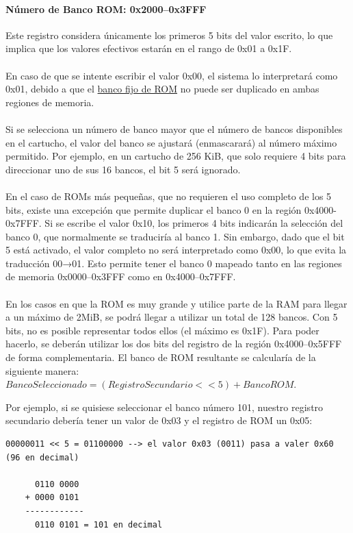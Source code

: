\paragraph{Número de Banco ROM: 0x2000–0x3FFF} Este registro considera únicamente los primeros 5 bits del valor escrito, lo que implica que los valores efectivos estarán en el rango de 0x01 a 0x1F.
\\\\
En caso de que se intente escribir el valor 0x00, el sistema lo interpretará como 0x01, debido a que el \hyperref[par:rom0bank]{banco fijo de ROM} no puede ser duplicado en ambas regiones de memoria.
\\\\
Si se selecciona un número de banco mayor que el número de bancos disponibles en el cartucho, el valor del banco se ajustará (enmascarará) al número máximo permitido. Por ejemplo, en un cartucho de 256 KiB, que solo requiere 4 bits para direccionar uno de sus 16 bancos, el bit 5 será ignorado.
\\\\
En el caso de ROMs más pequeñas, que no requieren el uso completo de los 5 bits, existe una excepción que permite duplicar el banco 0 en la región 0x4000-0x7FFF. Si se escribe el valor 0x10, los primeros 4 bits indicarán la selección del banco 0, que normalmente se traduciría al banco 1. Sin embargo, dado que el bit 5 está activado, el valor completo no será interpretado como 0x00, lo que evita la traducción 00→01. Esto permite tener el banco 0 mapeado tanto en las regiones de memoria 0x0000–0x3FFF como en 0x4000–0x7FFF.
\\\\
En los casos en que la ROM es muy grande y utilice parte de la RAM para llegar a un máximo de 2MiB, se podrá llegar a utilizar un total de 128 bancos. Con 5 bits, no es posible representar todos ellos (el máximo es 0x1F). Para poder hacerlo, se deberán utilizar los dos bits del registro de la región 0x4000–0x5FFF de forma complementaria. El banco de ROM resultante se calcularía de la siguiente manera: $BancoSeleccionado = (RegistroSecundario << 5) + BancoROM$.

Por ejemplo, si se quisiese seleccionar el banco número 101, nuestro registro secundario debería tener un valor de 0x03 y el registro de ROM un 0x05:

\begin{lstlisting}[language=Consola, caption={Selección del banco de ROM en cartuchos grandes.}, label={code:bigromselectbank}]
    00000011 << 5 = 01100000 --> el valor 0x03 (0011) pasa a valer 0x60 (96 en decimal)

      0110 0000
    + 0000 0101
    ------------
      0110 0101 = 101 en decimal
\end{lstlisting}

